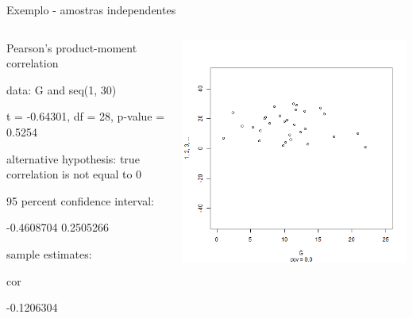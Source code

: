 \documentclass{beamer}
\begin{document}
\begin{frame}{Exemplo - amostras independentes}
  \begin{columns}
    \begin{column}{5cm}
      \begin{block}{}
              \tiny
      Pearson's product-moment correlation

        data:  G and seq(1, 30)
        
        t = -0.64301, df = 28, p-value = 0.5254
        
        alternative hypothesis: true correlation is not equal to 0
        
        95 percent confidence interval:
        
        -0.4608704  0.2505266
        
        sample estimates:
        
        cor
        
-0.1206304 
      \end{block}
   \end{column}
    \begin{column}{5cm}
  \begin{center}
    \includegraphics[height=.8\textheight]{Cap17/anim-n}
  \end{center}
    \end{column}
\end{columns}
\end{frame}
\end{document}
